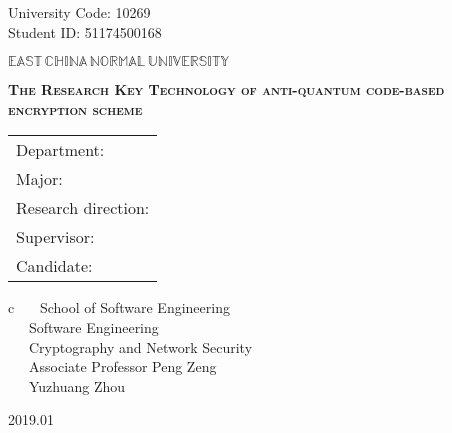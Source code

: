 \newpage

\pagestyle{empty}

\hskip 1.83cm {\large University Code: 10269}\\
\hspace*{\fill} {\large Student ID: 51174500168}

\vskip 2cm

\begin{center}
{\Huge $\mathbb{EAST}\,\mathbb{CHINA}\,\mathbb{NORMAL}\,
\mathbb{UNIVERSITY}$}
\end{center}

\vskip 3cm

\begin{center}
\bfseries{\scshape{\huge The Research Key Technology of anti-quantum code-based encryption scheme}}\\
\end{center}

\vskip 2cm {\large
\begin{center}
\begin{tabular}{l}
Department:\\
Major:\\
Research direction:\\
Supervisor:\\
Candidate:
\end{tabular}
\begin{tabular}c
~~~School of Software Engineering       \\
\hline ~~~Software Engineering    \\
\hline ~~~Cryptography and Network Security\\
\hline ~~~Associate Professor Peng Zeng\\
\hline ~~~Yuzhuang Zhou\\
\hline
\end{tabular}
\end{center}}

\vskip 30mm

\begin{center}
{\Large 2019.01}
\end{center}